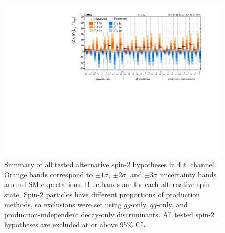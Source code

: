 \begin{figure}[htbp]
\begin{center}
\includegraphics[width=.9\linewidth]{HiggsProperties/figures/JP_SummaryPlot.pdf}
\caption[Summary of Spin-2 Exclusion Limits in $4\ell$ for $125.6$ $\rm{GeV}$ Higgs Boson]{Summary of all tested alternative spin-2 hypotheses in $4\ell$ channel. Orange bands correspond to $\pm1\sigma$, $\pm2\sigma$, and $\pm3\sigma$ uncertainty bands around SM expectations. Blue bands are for each alternative spin-state. Spin-2 particles have different proportions of production methods, so exclusions were set using $gg$-only, $q\bar{q}$-only, and production-independent decay-only discriminants. All tested spin-2 hypotheses are excluded at or above 95\% CL.}
\label{fig:Spin2Exclusions}
\end{center}
\end{figure}

